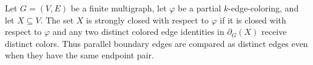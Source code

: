 \begin{definition}
Let $G=(V,E)$ be a finite multigraph, let $\varphi$ be a partial
$k$-edge-coloring, and let $X\subseteq V$.  The set $X$ is strongly closed
with respect to $\varphi$ if it is closed with respect to $\varphi$ and any
two distinct colored edge identities in $\partial_G(X)$ receive distinct
colors.  Thus parallel boundary edges are compared as distinct edges even
when they have the same endpoint pair.
\end{definition}
